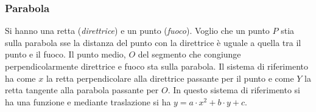 \documentclass[a4paper,12pt, oneside]{book}
\begin{document}
\subsubsection{Parabola}
\begin{definizione}
Si hanno una retta (\textit{direttrice}) e un punto (\textit{fuoco}). Voglio che un punto $P$ stia sulla parabola sse la distanza del punto con la direttrice è uguale a quella tra il punto e il fuoco. Il punto medio, $O$ del segmento che congiunge perpendicolarmente direttrice e fuoco sta sulla parabola. Il sistema di riferimento ha come $x$ la retta perpendicolare alla direttrice passante per il punto e come $Y$ la retta tangente alla parabola passante per $O$. In questo sistema di riferimento si ha una funzione e mediante traslazione si ha $y=a\cdot x^2+b\cdot y+c$.\\
~
\end{definizione}
\end{document}
